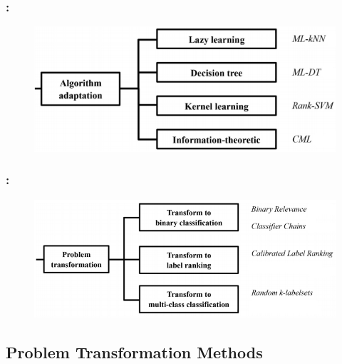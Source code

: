 \documentclass{beamer}
\begin{document}

\begin{frame}
\frametitle{\insertsection : \insertsubsection}
\begin{figure}
	\begin{center}
		\includegraphics[scale = 0.75]{images/aa.png}
	\end{center}
\end{figure}
\end{frame}

\begin{frame}
\frametitle{\insertsection : \insertsubsection}
\begin{figure}
	\begin{center}
		\includegraphics[scale = 0.7]{images/pt.png}
	\end{center}
\end{figure}
\end{frame}

\subsection{Problem Transformation Methods}
\end{document}
